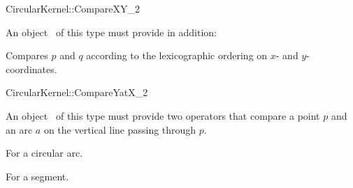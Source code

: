 \begin{ccRefFunctionObjectConcept}{CircularKernel::CompareXY_2} 

\ccRefines



An object \ccVar\ of this type must provide in addition: 

{Compares $p$ and $q$ according to the lexicographic ordering on $x$- and $y$-coordinates.}



\ccHasModels


\ccSeeAlso


\end{ccRefFunctionObjectConcept}

\begin{ccRefFunctionObjectConcept}{CircularKernel::CompareYatX_2}


An object \ccVar\ of this type must provide two operators that compare 
a point $p$ and an arc $a$ on the vertical line passing through $p$.

{For a circular arc.}

{For a segment.}

\ccHasModels


\ccSeeAlso


\end{ccRefFunctionObjectConcept}

